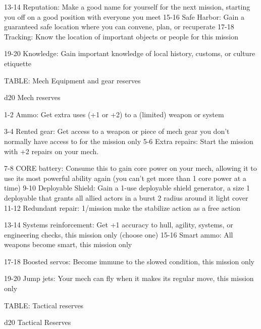    13-14   Reputation: Make a good name for yourself for the next mission, starting you off on a  
           good position with everyone you meet 
   15-16   Safe Harbor: Gain a guaranteed safe location where you can convene, plan, or  
           recuperate 
   17-18   Tracking: Know the location of important objects or people for this mission 

   19-20   Knowledge: Gain important knowledge of local history, customs, or culture etiquette  

TABLE: Mech Equipment and gear reserves  

 d20       Mech	reserves 

  1-2      Ammo: Get extra uses (+1 or +2) to a (limited) weapon or system 

  3-4      Rented gear: Get access to a weapon or piece of mech gear you don’t normally have  
           access to for the mission only 
  5-6      Extra repairs: Start the mission with +2 repairs on your mech. 

  7-8      CORE battery: Consume this to gain core power on your mech, allowing it to use its  
           most powerful ability again (you can’t get more than 1 core power at a time) 
 9-10      Deployable Shield: Gain a 1-use deployable shield generator, a size 1 deployable that  
           grants all allied actors in a burst 2 radius around it light cover 
   11-12   Redundant repair: 1/mission make the stabilize action as a free action 

   13-14   Systems reinforcement: Get +1 accuracy to hull, agility, systems, or engineering  
           checks, this mission only (choose one) 
   15-16   Smart ammo: All weapons become smart, this mission only 

   17-18   Boosted servos: Become immune to the slowed condition, this mission only 

   19-20   Jump jets: Your mech can fly when it makes its regular move, this mission only 

TABLE: Tactical reserves  

                                                                                                                


 d20       Tactical	Reserves 


